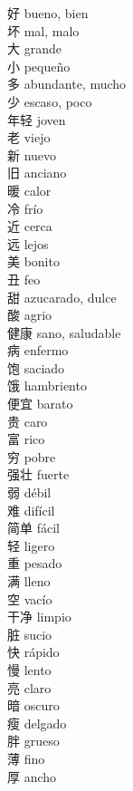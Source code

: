 好 \quad bueno, bien\\
坏 \quad mal, malo\\
大 \quad grande\\
小 \quad pequeño\\
多 \quad abundante, mucho\\
少 \quad escaso, poco\\
年轻 \quad joven\\
老 \quad viejo\\
新 \quad nuevo\\
旧 \quad anciano\\
暖 \quad calor\\
冷 \quad frío\\
近 \quad cerca\\
远 \quad lejos\\
美 \quad bonito\\
丑 \quad feo\\
甜 \quad azucarado, dulce\\
酸 \quad agrio\\
健康 \quad sano, saludable\\
病 \quad enfermo\\
饱 \quad saciado\\
饿 \quad hambriento\\
便宜 \quad barato\\
贵 \quad caro\\
富 \quad rico\\
穷 \quad pobre\\
强壮 \quad fuerte\\
弱 \quad débil\\
难 \quad difícil\\
简单 \quad fácil\\
轻 \quad ligero\\
重 \quad pesado\\
满 \quad lleno\\
空 \quad vacío\\
干净 \quad limpio\\
脏 \quad sucio\\
快 \quad rápido\\
慢 \quad lento\\
亮 \quad claro\\
暗 \quad oscuro\\
瘦 \quad delgado\\
胖 \quad grueso\\
薄 \quad fino\\
厚 \quad ancho\\
